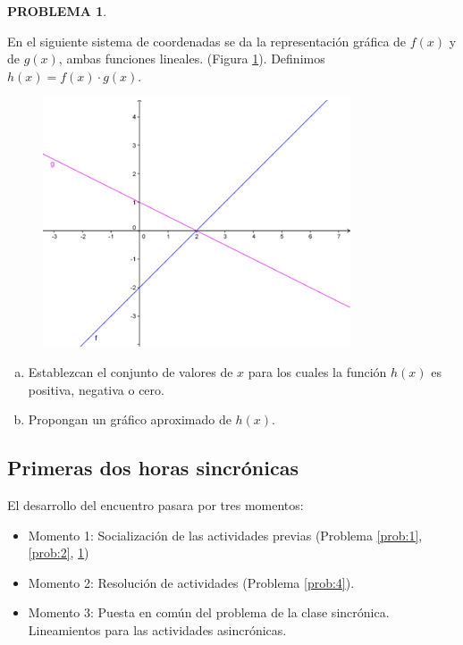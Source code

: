 \documentclass[oneside,spanish]{amsart}
\numberwithin{equation}{section}
\numberwithin{figure}{section}
\theoremstyle{definition}
\newtheorem{problema}{\normalfont PROBLEMA}
\begin{document}
\begin{problema}\label{prob:3}

En el siguiente sistema de coordenadas se da la representación gráfica de $f(x)$ y de $g(x)$, ambas funciones lineales. (Figura \ref{fig:imagen3}). Definimos $h(x) = f(x) \cdot g(x)$.

\begin{figure}[h]
	\centering
	\caption{}
	\label{fig:imagen3}
	\includegraphics[width=0.7\linewidth]{Anexos-03/Imagen3}
\end{figure}

\begin{enumerate}[a.]
	\item Establezcan el conjunto de valores de $x$ para los cuales la función $h(x)$ es positiva, negativa o cero.
	\item Propongan un gráfico aproximado de $h(x)$.
\end{enumerate}
\end{problema}

\subsection{Primeras dos horas sincrónicas}\label{subsec:primeras-dos}

El desarrollo del encuentro pasara por tres momentos:

\begin{itemize}[ ]
	\item Momento 1: Socialización de las actividades previas (Problema \ref{prob:1}, \ref{prob:2}, \ref{prob:3})
	\item Momento 2: Resolución de actividades (Problema \ref{prob:4}).
	\item Momento 3: Puesta en común del problema de la clase sincrónica. Lineamientos para las actividades asincrónicas. 
\end{itemize}
\end{document}
